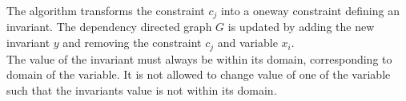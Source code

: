 The algorithm transforms the constraint $c_j$ into a oneway constraint defining an invariant. The dependency directed 
graph $G$ is updated by adding the new invariant $y$ and removing the constraint $c_j$ and variable $x_i$. \\
The value of the invariant must always be within its domain, corresponding to domain of the variable. It is not allowed 
to change value of one of the variable such that the invariants value is not within its domain.





